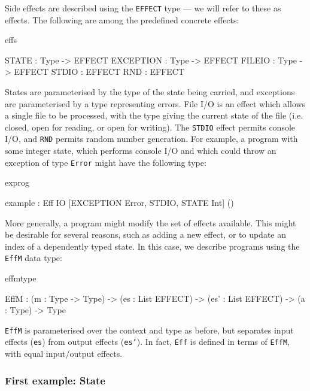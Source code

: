 Side effects are described using the \texttt{EFFECT} type --- we will refer
to these as  effects.  The following are 
among the predefined concrete effects:

\begin{SaveVerbatim}{effs}

STATE     : Type -> EFFECT
EXCEPTION : Type -> EFFECT
FILEIO    : Type -> EFFECT
STDIO     : EFFECT
RND       : EFFECT

\end{SaveVerbatim}

\noindent
States are parameterised by the type of the state being carried, and exceptions
are parameterised by a type representing errors. File I/O is an effect which
allows a single file to be processed, with the type giving the current state
of the file (i.e. closed, open for reading, or open for writing). The
\texttt{STDIO} effect permits console I/O, and \texttt{RND} permits random
number generation.
%
For example, a program with some integer state, which performs console I/O 
and which could throw
an exception of type \texttt{Error} might have the following type:

\noindent
\begin{SaveVerbatim}{exprog}

 example : Eff IO [EXCEPTION Error, STDIO, STATE Int] ()

\end{SaveVerbatim}

\noindent
More generally, a program might modify the set of effects available. This
might be desirable for several reasons, such as adding a new effect, or to
update an index of a dependently typed state. In this case, we describe
programs using the \texttt{EffM} data type:

\begin{SaveVerbatim}{effmtype}

EffM : (m   : Type -> Type) -> 
       (es  : List EFFECT) -> 
       (es' : List EFFECT) -> 
       (a   : Type) -> Type

\end{SaveVerbatim}

\noindent
\texttt{EffM} is parameterised over the context and type as before,
but separates input effects (\texttt{es}) from output effects (\texttt{es'}).
In fact, \texttt{Eff} is defined in terms of \texttt{EffM}, with equal
input/output effects.

\subsubsection{First example: State}

